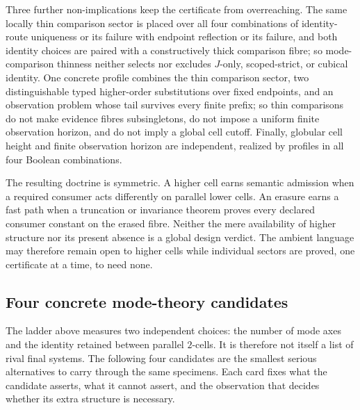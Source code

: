 \documentclass[11pt]{article}
\theoremstyle{definition}
\theoremstyle{remark}
\begin{document}
Three further non-implications keep the certificate from overreaching.  The
same locally thin comparison sector is placed over all four combinations of
identity-route uniqueness or its failure with endpoint reflection or its
failure, and both identity choices are paired with a constructively thick
comparison fibre; so mode-comparison thinness neither selects nor excludes
$J$-only, scoped-strict, or cubical identity.  One concrete profile combines
the thin comparison sector, two distinguishable typed higher-order
substitutions over fixed endpoints, and an observation problem whose tail
survives every finite prefix; so thin comparisons do not make evidence fibres
subsingletons, do not impose a uniform finite observation horizon, and do not
imply a global cell cutoff.  Finally, globular cell height and finite
observation horizon are independent, realized by profiles in all four Boolean
combinations.

The resulting doctrine is symmetric.  A higher cell earns semantic admission
when a required consumer acts differently on parallel lower cells.  An erasure
earns a fast path when a truncation or invariance theorem proves every
declared consumer constant on the erased fibre.  Neither the mere availability
of higher structure nor its present absence is a global design verdict.  The
ambient language may therefore remain open to higher cells while individual
sectors are proved, one certificate at a time, to need none.

\subsection{Four concrete mode-theory candidates}

The ladder above measures two independent choices: the number of mode axes and
the identity retained between parallel $2$-cells.  It is therefore not itself
a list of rival final systems.  The following four candidates are the smallest
serious alternatives to carry through the same specimens.  Each card fixes
what the candidate asserts, what it cannot assert, and the observation that
decides whether its extra structure is necessary.
\end{document}
